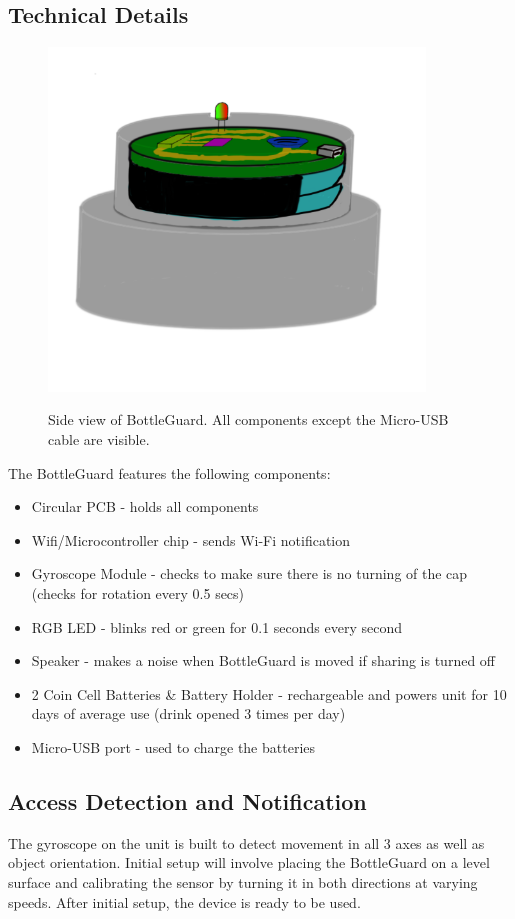 \documentclass[12pt]{article}
\begin{document}
	\subsection*{Technical Details}
	\begin{figure}[H]
		\centering
		\includegraphics[width=10cm]{design.png}
		\label{fig:des}
		\caption{Side view of BottleGuard. All components except the Micro-USB cable are visible.}
	\end{figure}
	The BottleGuard features the following components:
	\begin{itemize}
		\item 	Circular PCB - holds all components
		\item 	Wifi/Microcontroller chip - sends Wi-Fi notification
		\item 	Gyroscope Module - checks to make sure there is no turning of the cap (checks for rotation every 0.5 secs)
		\item 	RGB LED - blinks red or green for 0.1 seconds every second
		\item 	Speaker - makes a noise when BottleGuard is moved if sharing is turned off
		\item 	2 Coin Cell Batteries \& Battery Holder - rechargeable and powers unit for 10 days of average use (drink opened 3 times per day)
		\item 	Micro-USB port - used to charge the batteries
	\end{itemize}
	\subsection*{Access Detection and Notification}
	The gyroscope on the unit is built to detect movement in all 3 axes as well as object orientation. Initial setup will involve placing the BottleGuard on a level surface and calibrating the sensor by turning it in both directions at varying speeds. After initial setup, the device is ready to be used. 
	
\end{document}
